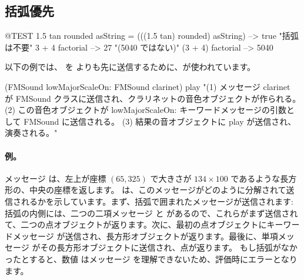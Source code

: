 \documentclass[a4paper,10pt,twoside]{book}
\begin{document}
\subsection{括弧優先}


\begin{code}{@TEST}
1.5 tan rounded asString = (((1.5 tan) rounded) asString) --> true    "括弧は不要"
3 + 4 factorial   --> 27    "(5040 ではない)"
(3 + 4) factorial --> 5040
\end{code}

以下の例では、 を  よりも先に送信するために、が使われています。
\begin{code}{}
(FMSound lowMajorScaleOn: FMSound clarinet) play 
"(1) メッセージ clarinet が FMSound クラスに送信され、クラリネットの音色オブジェクトが作られる。
 (2) この音色オブジェクトが lowMajorScaleOn: キーワードメッセージの引数として FMSound に送信される。
 (3) 結果の音オブジェクトに play が送信され、演奏される。"
\end{code}



\paragraph{例。}
メッセージ  は、左上が座標 $(65, 325)$ で大きさが $134{\times}100$ であるような長方形の、中央の座標を返します。 は、このメッセージがどのように分解されて送信されるかを示しています。まず、括弧で囲まれたメッセージが送信されます: 括弧の内側には、二つの二項メッセージ  と  があるので、これらがまず送信されて、二つの点オブジェクトが返ります。次に、最初の点オブジェクトにキーワードメッセージ  が送信され、長方形オブジェクトが返ります。最後に、単項メッセージ  がその長方形オブジェクトに送信され、点が返ります。
もし括弧がなかったとすると、数値  はメッセージ  を理解できないため、評価時にエラーとなります。
\end{document}

